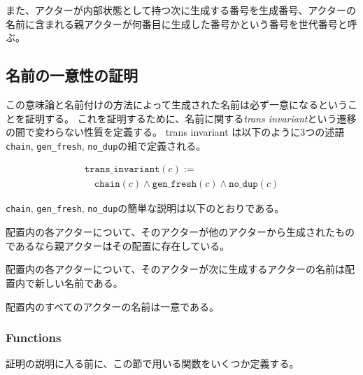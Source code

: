 また、アクターが内部状態として持つ次に生成する番号を生成番号、アクターの名前に含まれる親アクターが何番目に生成した番号かという番号を世代番号と呼ぶ。

\subsection{名前の一意性の証明}

この意味論と名前付けの方法によって生成された名前は必ず一意になるということを証明する。
これを証明するために、名前に関する\textit{trans invariant}という遷移の間で変わらない性質を定義する。
trans invariant は以下のように3つの述語\texttt{chain}, \texttt{gen\_fresh}, \texttt{no\_dup}の組で定義される。

\begin{displaymath}
  \begin{array}{l}
    \texttt{trans\_invariant}(c) := \\
    \quad \texttt{chain}(c) \wedge \texttt{gen\_fresh}(c) \wedge \texttt{no\_dup}(c)
  \end{array}
\end{displaymath}

\texttt{chain}, \texttt{gen\_fresh}, \texttt{no\_dup}の簡単な説明は以下のとおりである。

\begin{description}[style=nextline,leftmargin=12pt,parsep=0pt]
\item[\texttt{chain}]
  配置内の各アクターについて、そのアクターが他のアクターから生成されたものであるなら親アクターはその配置に存在している。
\item[\texttt{gen\_fresh}]
  配置内の各アクターについて、そのアクターが次に生成するアクターの名前は配置内で新しい名前である。
\item[\texttt{no\_dup}]
  配置内のすべてのアクターの名前は一意である。
\end{description}

\subsubsection{Functions}

証明の説明に入る前に、この節で用いる関数をいくつか定義する。


